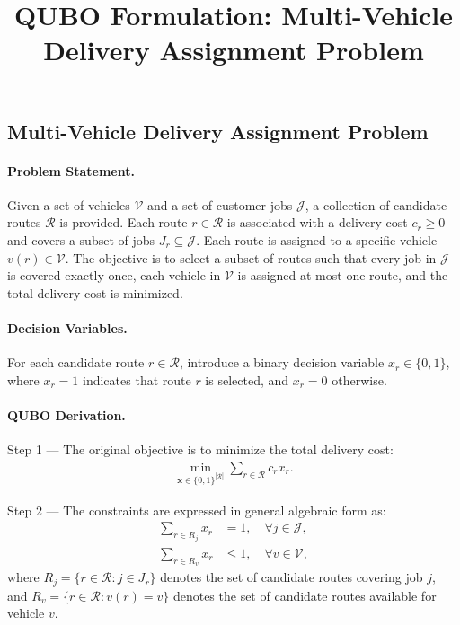 \documentclass[12pt]{article}
\title{QUBO Formulation: Multi-Vehicle Delivery Assignment Problem}
\date{}
\begin{document}
\maketitle

\subsection*{Multi-Vehicle Delivery Assignment Problem}

\paragraph{Problem Statement.}
Given a set of vehicles $\mathcal{V}$ and a set of customer jobs $\mathcal{J}$, a collection of candidate routes $\mathcal{R}$ is provided. Each route $r \in \mathcal{R}$ is associated with a delivery cost $c_r \ge 0$ and covers a subset of jobs $J_r \subseteq \mathcal{J}$. Each route is assigned to a specific vehicle $v(r) \in \mathcal{V}$. The objective is to select a subset of routes such that every job in $\mathcal{J}$ is covered exactly once, each vehicle in $\mathcal{V}$ is assigned at most one route, and the total delivery cost is minimized.

\paragraph{Decision Variables.}
For each candidate route $r \in \mathcal{R}$, introduce a binary decision variable $x_r \in \{0,1\}$, where $x_r = 1$ indicates that route $r$ is selected, and $x_r = 0$ otherwise.

\paragraph{QUBO Derivation.}
Step 1 --- The original objective is to minimize the total delivery cost:
\begin{align}
    \min_{\mathbf{x} \in \{0,1\}^{|\mathcal{R}|}} \sum_{r \in \mathcal{R}} c_r x_r.
\end{align}

Step 2 --- The constraints are expressed in general algebraic form as:
\begin{align}
    \sum_{r \in R_j} x_r &= 1, \quad \forall j \in \mathcal{J}, \\
    \sum_{r \in R_v} x_r &\le 1, \quad \forall v \in \mathcal{V},
\end{align}
where $R_j = \{r \in \mathcal{R} : j \in J_r\}$ denotes the set of candidate routes covering job $j$, and $R_v = \{r \in \mathcal{R} : v(r) = v\}$ denotes the set of candidate routes available for vehicle $v$.
\end{document}
